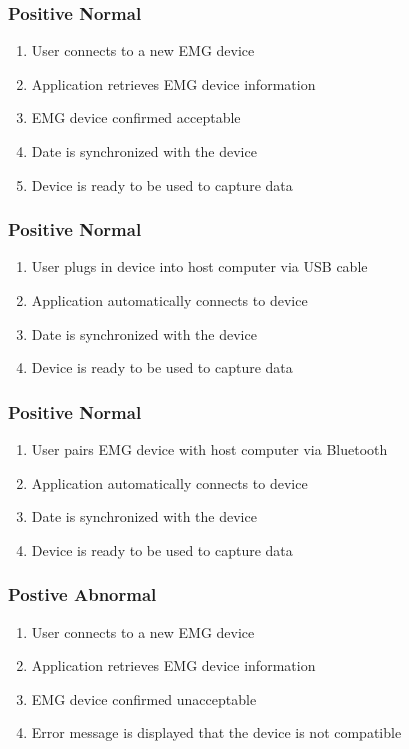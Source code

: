 \documentclass[12pt,a4paper]{article}
\begin{document}
\subsubsection{Positive Normal}

\begin{enumerate}
	\item User connects to a new EMG device
	\item Application retrieves EMG device information
	\item EMG device confirmed acceptable
	\item Date is synchronized with the device
	\item Device is ready to be used to capture data
\end{enumerate}

\subsubsection{Positive Normal}

\begin{enumerate}
	\item User plugs in device into host computer via USB cable
	\item Application automatically connects to device
	\item Date is synchronized with the device
	\item Device is ready to be used to capture data
\end{enumerate}

\subsubsection{Positive Normal}

\begin{enumerate}
	\item User pairs EMG device with host computer via Bluetooth
	\item Application automatically connects to device
	\item Date is synchronized with the device
	\item Device is ready to be used to capture data
\end{enumerate}

\subsubsection{Postive Abnormal}

\begin{enumerate}
	\item User connects to a new EMG device
	\item Application retrieves EMG device information
	\item EMG device confirmed unacceptable
	\item Error message is displayed that the device is not compatible 
\end{enumerate}
\end{document}
